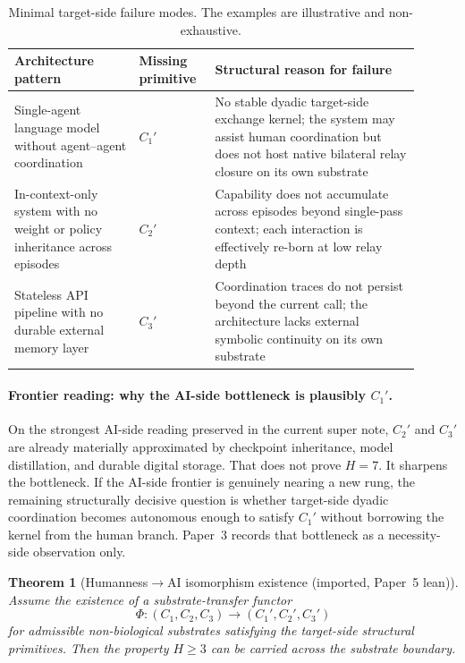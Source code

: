 \documentclass[11pt]{article}
\newtheorem{theorem}{Theorem}
\begin{document}
\begin{table}[h]
\centering
\small
\caption{Minimal target-side failure modes.  The examples are illustrative and
non-exhaustive.}
\label{tab:S-AIsubstrate-failures}
\begin{tabular}{p{0.28\linewidth}p{0.16\linewidth}p{0.46\linewidth}}
\toprule
Architecture pattern & Missing primitive & Structural reason for failure \\
\midrule
Single-agent language model without agent--agent coordination & $C_1'$ & No stable dyadic target-side exchange kernel; the system may assist human coordination but does not host native bilateral relay closure on its own substrate \\

In-context-only system with no weight or policy inheritance across episodes & $C_2'$ & Capability does not accumulate across episodes beyond single-pass context; each interaction is effectively re-born at low relay depth \\

Stateless API pipeline with no durable external memory layer & $C_3'$ & Coordination traces do not persist beyond the current call; the architecture lacks external symbolic continuity on its own substrate \\
\bottomrule
\end{tabular}
\end{table}

\paragraph{Frontier reading: why the AI-side bottleneck is plausibly $C_1'$.}
On the strongest AI-side reading preserved in the current super note,
$C_2'$ and
$C_3'$
are already materially approximated by checkpoint inheritance,
model distillation,
and durable digital storage.
That does not prove
$H{=}7$.
It sharpens the bottleneck.
If the AI-side frontier is genuinely nearing a new rung,
the remaining structurally decisive question is whether target-side dyadic
coordination becomes autonomous enough to satisfy
$C_1'$
without borrowing the kernel from the human branch.
Paper~3 records that bottleneck as a necessity-side observation only.

\begin{theorem}[Humanness$\to$AI isomorphism existence
  (imported, Paper~5 lean)]
\label{thm:S-AIsubstrate-imported}
Assume the existence of a substrate-transfer functor
\begin{equation}
\Phi:
(C_1,C_2,C_3)
\longrightarrow
(C_1',C_2',C_3')
\label{eq:S-AIsubstrate-Phi}
\end{equation}
for admissible non-biological substrates satisfying the target-side structural
primitives.
Then the property
$H\ge 3$
can be carried across the substrate boundary.
\end{theorem}
\end{document}
